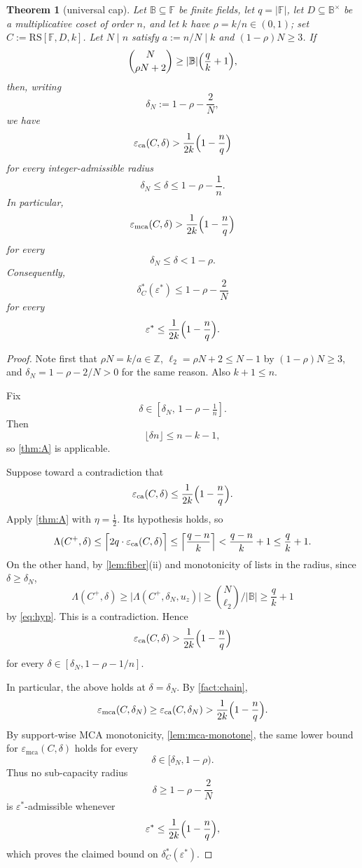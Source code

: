 \documentclass[11pt]{article}
\newtheorem{theorem}{Theorem}[section]
\theoremstyle{definition}
\theoremstyle{remark}
\newcommand{\F}{\mathbb{F}}
\newcommand{\B}{\mathbb{B}}
\newcommand{\RS}{\mathrm{RS}}
\newcommand{\eca}{\varepsilon_{\mathrm{ca}}}
\newcommand{\emca}{\varepsilon_{\mathrm{mca}}}
\newcommand{\Lst}{\Lambda}
\begin{document}
\begin{theorem}[universal cap]\label{thm:main}
Let $\B\subseteq\F$ be finite fields, let $q=|\F|$, let $D\subseteq\B^\times$ be a multiplicative coset of order $n$, and let $k$ have $\rho=k/n\in(0,1)$; set $C:=\RS[\F,D,k]$. Let $N\mid n$ satisfy $a:=n/N\mid k$ and $(1-\rho)N\ge3$. If
\begin{equation}\label{eq:hyp}
        \binom{N}{\rho N+2}
        \ge
        |\B|\Bigl(\frac qk+1\Bigr),
\end{equation}
then, writing
\[
        \delta_N:=1-\rho-\frac2N,
\]
we have
\[
\eca(C,\delta)
>
\frac1{2k}\Bigl(1-\frac nq\Bigr)
\]
for every integer-admissible radius
\[
        \delta_N\le \delta \le 1-\rho-\frac1n .
\]
In particular,
\[
        \emca(C,\delta)
        >
        \frac1{2k}\Bigl(1-\frac nq\Bigr)
\]
for every
\[
        \delta_N\le \delta < 1-\rho .
\]
Consequently,
\[
        \delta^*_C(\varepsilon^*)
        \le
        1-\rho-\frac2N
\]
for every
\[
        \varepsilon^*
        \le
        \frac1{2k}\Bigl(1-\frac nq\Bigr).
\]
\end{theorem}

\begin{proof}
Note first that $\rho N=k/a\in\mathbb Z$, $\ell_2=\rho N+2\le N-1$ by $(1-\rho)N\ge3$, and $\delta_N=1-\rho-2/N>0$ for the same reason. Also $k+1\le n$.

Fix
\[
        \delta\in[\delta_N,\,1-\rho-\tfrac1n].
\]
Then
\[
        \lfloor \delta n\rfloor \le n-k-1,
\]
so \cref{thm:A} is applicable.

Suppose toward a contradiction that
\[
        \eca(C,\delta)
        \le
        \frac1{2k}\Bigl(1-\frac nq\Bigr).
\]
Apply \cref{thm:A} with $\eta=\frac12$. Its hypothesis holds, so
\[
        \Lst(C^+,\delta)
        \le
        \Bigl\lceil 2q\cdot \eca(C,\delta)\Bigr\rceil
        \le
        \Bigl\lceil\frac{q-n}{k}\Bigr\rceil
        <
        \frac{q-n}{k}+1
        \le
        \frac qk+1 .
\]
On the other hand, by \cref{lem:fiber}(ii) and monotonicity of lists in the radius, since $\delta\ge\delta_N$,
\[
        \Lst(C^+,\delta)
        \ge
        \bigl|\Lst(C^+,\delta_N,u_z)\bigr|
        \ge
        \binom{N}{\ell_2}\Big/|\B|
        \ge
        \frac qk+1
\]
by \eqref{eq:hyp}. This is a contradiction. Hence
\[
        \eca(C,\delta)
        >
        \frac1{2k}\Bigl(1-\frac nq\Bigr)
\]
for every $\delta\in[\delta_N,1-\rho-1/n]$.

In particular, the above holds at $\delta=\delta_N$. By \cref{fact:chain},
\[
        \emca(C,\delta_N)
        \ge
        \eca(C,\delta_N)
        >
        \frac1{2k}\Bigl(1-\frac nq\Bigr).
\]
By support-wise MCA monotonicity, \cref{lem:mca-monotone}, the same lower bound for $\emca(C,\delta)$ holds for every
\[
        \delta\in[\delta_N,1-\rho).
\]
Thus no sub-capacity radius
\[
        \delta\ge 1-\rho-\frac2N
\]
is $\varepsilon^*$-admissible whenever
\[
        \varepsilon^*
        \le
        \frac1{2k}\Bigl(1-\frac nq\Bigr),
\]
which proves the claimed bound on $\delta^*_C(\varepsilon^*)$.
\end{proof}
\end{document}
